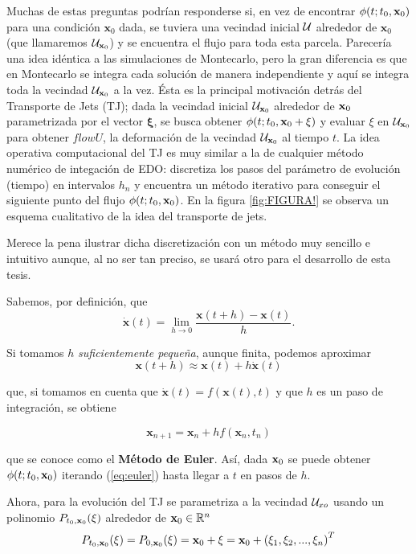 Muchas de estas preguntas podrían responderse si, en vez de encontrar $\phi(t;t_0,\mathbf{x}_0)$ para una condición $\mathbf{x}_0$ dada, se tuviera una vecindad inicial $\mathcal{U}$ alrededor de $\mathbf{x}_0$ (que llamaremos $\mathcal{U}_{\mathbf{x}_0}$) y se encuentra el flujo para toda esta parcela. Parecería una idea idéntica a las simulaciones de Montecarlo, pero la gran diferencia es que en Montecarlo se integra cada solución de manera independiente y aquí se integra toda la vecindad $\mathcal{U}_{\mathbf{x}_0}$ a la vez. Ésta es la principal motivación detrás del Transporte de Jets (TJ); dada la vecindad inicial $\mathcal{U}_{\mathbf{x}_0}$ alrededor de $\mathbf{x}_0$ parametrizada por el vector $\mathbf{\xi}$, se busca obtener $\phi(t;t_0,\mathbf{x}_0 + \xi)$ y evaluar $\xi$ en $\mathcal{U}_{\mathbf{x}_0}$ para obtener $flowU$, la deformación de la vecindad $\mathcal{U}_{\mathbf{x}_0}$ al tiempo $t$. La idea operativa computacional del TJ es muy similar a la de cualquier método numérico de integación de EDO: discretiza los pasos del parámetro de evolución (tiempo) en intervalos $h_n$ y encuentra un método iterativo para conseguir el siguiente punto del flujo $\phi(t;t_0,\mathbf{x}_0)$. En la figura \ref{fig:FIGURA!} se observa un esquema cualitativo de la idea del transporte de jets.


Merece la pena ilustrar dicha discretización con un método muy sencillo e intuitivo aunque, al  no ser tan preciso, se usará otro para el desarrollo de esta tesis.

Sabemos, por definición, que 
\begin{equation*}
 \dot{\mathbf{x}}(t) = \lim_{h\to 0} \frac{\mathbf{x}(t+h)-\mathbf{x}(t)}{h}.
\end{equation*}  

Si tomamos $h$ \textit{suficientemente pequeña}, aunque finita, podemos aproximar
\begin{equation*}
 \mathbf{x}(t+h) \approx \mathbf{x}(t) + h \dot{\mathbf{x}}(t)
\end{equation*}

que, si tomamos en cuenta que $\dot{\mathbf{x}}(t) = f(\mathbf{x}(t),t)$ y que $h$ es un paso de integración, se obtiene
 
\begin{equation}
 \mathbf{x}_{n+1} = \mathbf{x}_n + h f(\mathbf{x}_n,t_n)
 \label{eq:euler} 
\end{equation}

que se conoce como el \textbf{Método de Euler}. Así, dada $\mathbf{x}_0$ se puede obtener $\phi(t;t_0,\mathbf{x}_0)$ iterando (\ref{eq:euler}) hasta llegar a $t$ en pasos de $h$.

Ahora, para la evolución del TJ se parametriza a la vecindad $\mathcal{U}_{xo}$ usando un polinomio $P_{t_0,\mathbf{x}_0}(\xi)$ alrededor de $\mathbf{x}_0 \in \mathbb{R}^n$ 
\begin{equation*}
 P_{t_0,\mathbf{x}_0}(\xi) = P_{0,\mathbf{x}_0}(\xi) = \mathbf{x}_0 + \xi = \mathbf{x}_0 + \left( \xi_1, \xi_2, ..., \xi_n \right)^T
\end{equation*} 

